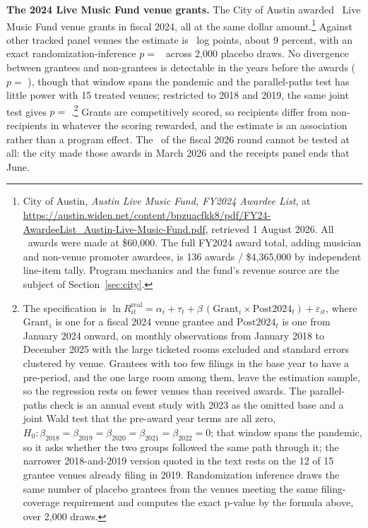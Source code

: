 \textbf{The 2024 Live Music Fund venue grants.} The City of Austin
awarded \NQuasiLmfTwoFourVenueAwards\ Live Music Fund venue grants in fiscal
2024, all at the same dollar amount.\footnote{City of Austin, \textit{Austin
Live Music Fund, FY2024 Awardee List}, at
\url{https://austin.widen.net/content/bpzuacfkk8/pdf/FY24-AwardeeList_Austin-Live-Music-Fund.pdf},
retrieved 1 August 2026. All \NQuasiLmfTwoFourVenueAwards\ awards were made at
\$60,000. The full FY2024 award total, adding musician and non-venue promoter
awardees, is 136 awards / \$4,365,000 by independent line-item tally. Program
mechanics and the fund's revenue source are the subject of
Section~\ref{sec:city}.} Against other tracked panel venues the estimate is
\NQuasiLmfTwoFourPostCoef\ log points, about 9 percent, with an exact
randomization-inference $p =$ \NQuasiLmfTwoFourRiP\ across 2,000 placebo draws.
No divergence between grantees and non-grantees is detectable in the years
before the awards ($p =$ \NQuasiLmfTwoFourPretrendP), though that window spans
the pandemic and the parallel-paths test has little power with 15 treated
venues; restricted to 2018 and 2019, the same joint test gives $p =$
\NQuasiLmfTwoFourPretrendPPrepandemic.\footnote{The specification is
\(\ln R^{\mathrm{real}}_{it} = \alpha_i + \tau_t
   + \beta\,(\mathrm{Grant}_i \times \mathrm{Post2024}_t) + \varepsilon_{it}\),
where \(\mathrm{Grant}_i\) is one for a fiscal 2024 venue grantee and
\(\mathrm{Post2024}_t\) is one from January 2024 onward, on monthly
observations from January 2018 to December 2025 with the large ticketed rooms
excluded and standard errors clustered by venue. Grantees with too few filings
in the base year to have a pre-period, and the one large room among them,
leave the estimation sample, so the regression rests on fewer venues than
received awards. The parallel-paths check is an annual event study with 2023
as the omitted base and a joint Wald test that the pre-award year terms are
all zero, \(H_0: \beta_{2018} = \beta_{2019} = \beta_{2020} = \beta_{2021} =
\beta_{2022} = 0\); that window spans the pandemic, so it asks whether the two
groups followed the same path through it; the narrower 2018-and-2019 version
quoted in the text rests on the 12 of 15 grantee venues already filing in 2019.
Randomization inference draws
the same number of placebo grantees from the venues meeting the same
filing-coverage requirement and computes the exact p-value by the formula
above, over 2,000 draws.} Grants are competitively scored, so recipients
differ from non-recipients in whatever the scoring rewarded, and the estimate is
an association rather than a program effect. The
\NQuasiLmfFyTwoSixNotEvaluable\ of the fiscal 2026 round cannot
be tested at all: the city made those awards in March 2026 and the receipts
panel ends that June.

